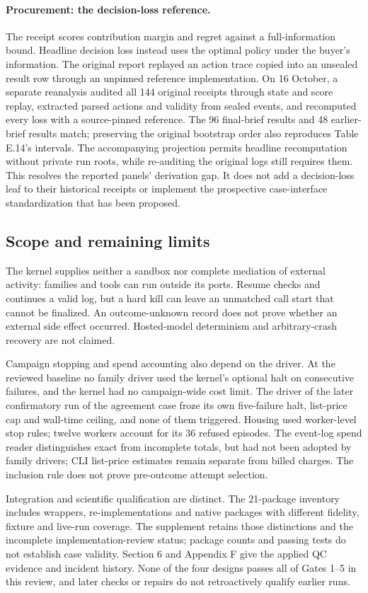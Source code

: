 \paragraph{Procurement: the decision-loss reference.}
The receipt scores contribution margin and regret against a
full-information bound. Headline decision loss instead uses the optimal
policy under the buyer's information. The original report replayed an
action trace copied into an unsealed result row through an unpinned
reference implementation. On 16 October, a separate
reanalysis audited all 144 original receipts through
state and score replay, extracted parsed actions and validity from sealed
events, and recomputed every loss with a source-pinned reference. The 96
final-brief results and 48 earlier-brief results match; preserving the
original bootstrap order also reproduces Table E.14's intervals. The
accompanying projection permits headline recomputation without private
run roots, while re-auditing the original logs still requires them.
This resolves the reported panels' derivation gap. It does not add a
decision-loss leaf to their historical receipts or implement the
prospective case-interface standardization that has been proposed.

\subsection{Scope and remaining limits}
\label{app:runtime-limits}

The kernel supplies neither a sandbox nor complete mediation of external
activity: families and tools can run outside its ports. Resume checks and
continues a valid log, but a hard kill can leave an unmatched call start
that cannot be finalized. An outcome-unknown record does not prove
whether an external side effect occurred. Hosted-model determinism and
arbitrary-crash recovery are not claimed.

Campaign stopping and spend accounting also depend on the driver.
At the reviewed baseline no family driver used the kernel's optional
halt on consecutive failures, and the kernel had no campaign-wide
cost limit. The driver of the later confirmatory run of the agreement case froze its
own five-failure halt, list-price cap and wall-time ceiling, and none of them triggered. Housing used worker-level stop rules; twelve
workers account for its 36 refused episodes. The event-log spend reader
distinguishes exact from incomplete totals, but had not been adopted by
family drivers; CLI list-price estimates remain separate from billed
charges. The inclusion rule does not prove pre-outcome attempt selection.

Integration and scientific qualification are distinct. The 21-package
inventory includes wrappers, re-implementations and native packages with
different fidelity, fixture and live-run coverage. The supplement retains
those distinctions and the incomplete implementation-review status;
package counts and passing tests do not establish case validity.
Section 6 and Appendix F give the applied QC evidence and incident
history. None of the four designs passes all of Gates 1--5 in this review,
and later checks or repairs do not retroactively qualify earlier runs.

